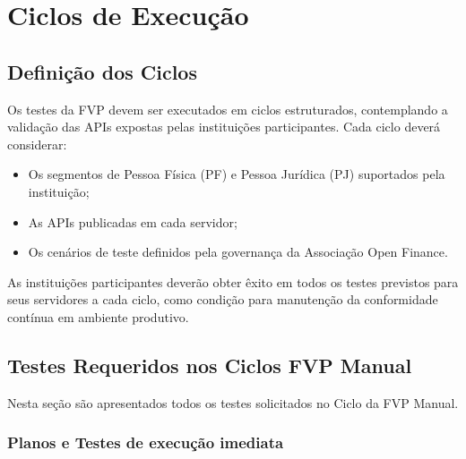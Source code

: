 \chapter{Ciclos de Execução}

\section{Definição dos Ciclos}

Os testes da FVP devem ser executados em ciclos estruturados, contemplando a validação das APIs expostas pelas instituições participantes. Cada ciclo deverá considerar:

\begin{itemize}
    \item Os segmentos de Pessoa Física (PF) e Pessoa Jurídica (PJ) suportados pela instituição;
    \item As APIs publicadas em cada servidor;
    \item Os cenários de teste definidos pela governança da Associação Open Finance.
\end{itemize}
As instituições participantes deverão obter êxito em todos os testes previstos para seus servidores a cada ciclo, como condição para manutenção da conformidade contínua em ambiente produtivo.

\section{Testes Requeridos nos Ciclos FVP Manual}

Nesta seção são apresentados todos os testes solicitados no Ciclo da FVP Manual.

\subsection{Planos e Testes de execução imediata}

